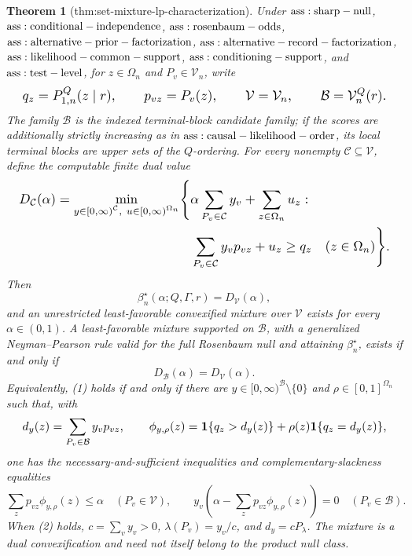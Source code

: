\documentclass{article}
\newtheorem{theorem}{Theorem}
\begin{document}
\begin{theorem}[thm:set-mixture-lp-characterization]\label{thm:set-mixture-lp-characterization}
Under \({\rm ass:sharp-null}\), \({\rm ass:conditional-independence}\), \({\rm ass:rosenbaum-odds}\), \({\rm ass:alternative-prior-factorization}\), \({\rm ass:alternative-record-factorization}\), \({\rm ass:likelihood-common-support}\), \({\rm ass:conditioning-support}\), and \({\rm ass:test-level}\), for \(z\in\Omega_n\) and \(P_v\in\mathcal V_n\), write
\[
\makebox[\linewidth][c]{\resizebox{0.98\linewidth}{!}{\par\noindent \makebox[\linewidth][c]{\resizebox{0.98\linewidth}{!}{\(\displaystyle \displaystyle q_z=P_{1,n}^{Q}(z\mid r),\qquad p_{vz}=P_v(z),\qquad \mathcal V=\mathcal V_n,\qquad \mathcal B=\mathcal V_n^Q(r).\)}}\par\noindent}}
\]
The family \(\mathcal B\) is the indexed terminal-block candidate family; if the scores are additionally strictly increasing as in \({\rm ass:causal-likelihood-order}\), its local terminal blocks are upper sets of the \(Q\)-ordering. For every nonempty \(\mathcal C\subseteq\mathcal V\), define the computable finite dual value
\[
\makebox[\linewidth][c]{\resizebox{0.98\linewidth}{!}{\(\displaystyle \begin{aligned}
 D_{\mathcal C}(\alpha)=\min_{\substack{y\in[0,\infty)^{\mathcal C},\ u\in[0,\infty)^{\Omega_n}}}\Biggl\{&\alpha\sum_{P_v\in\mathcal C}y_v+\sum_{z\in\Omega_n}u_z:\\
 &\sum_{P_v\in\mathcal C}y_vp_{vz}+u_z\geq q_z\quad(z\in\Omega_n)\Biggr\}.
 \end{aligned}\)}}
\]
Then
\[
 \beta_n^\star(\alpha;Q,\Gamma,r)=D_{\mathcal V}(\alpha),
\]
and an unrestricted least-favorable convexified mixture over \(\mathcal V\) exists for every \(\alpha\in(0,1)\). A least-favorable mixture supported on \(\mathcal B\), with a generalized Neyman--Pearson rule valid for the full Rosenbaum null and attaining \(\beta_n^\star\), exists if and only if
\[
 D_{\mathcal B}(\alpha)=D_{\mathcal V}(\alpha).\tag{1}
\]
Equivalently, (1) holds if and only if there are \(y\in[0,\infty)^{\mathcal B}\setminus\{0\}\) and \(\rho\in[0,1]^{\Omega_n}\) such that, with
\[
\makebox[\linewidth][c]{\resizebox{0.98\linewidth}{!}{\par\noindent \makebox[\linewidth][c]{\resizebox{0.98\linewidth}{!}{\(\displaystyle \displaystyle d_y(z)=\sum_{P_v\in\mathcal B}y_vp_{vz},\qquad \phi_{y,\rho}(z)=\mathbf1\{q_z>d_y(z)\}+\rho(z)\mathbf1\{q_z=d_y(z)\},\)}}\par\noindent}}
\]
one has the necessary-and-sufficient inequalities and complementary-slackness equalities
\[
 \sum_zp_{vz}\phi_{y,\rho}(z)\leq\alpha\quad(P_v\in\mathcal V),\qquad y_v\left(\alpha-\sum_zp_{vz}\phi_{y,\rho}(z)\right)=0\quad(P_v\in\mathcal B).\tag{2}
\]
When (2) holds, \(c=\sum_vy_v>0\), \(\lambda(P_v)=y_v/c\), and \(d_y=cP_\lambda\). The mixture is a dual convexification and need not itself belong to the product null class.


\end{theorem}
\end{document}
